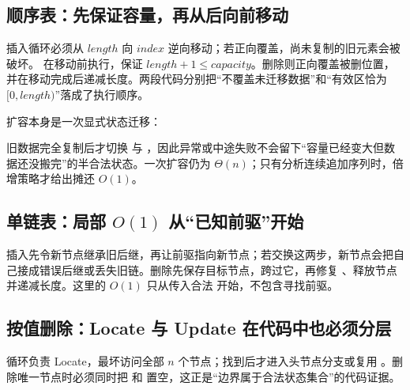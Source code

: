\documentclass[UTF8,fontset=none,11pt,a4paper]{ctexart}
\begin{document}
\subsection{顺序表：先保证容量，再从后向前移动}


插入循环必须从 $length$ 向 $index$ 逆向移动；若正向覆盖，尚未复制的旧元素会被破坏。 在移动前执行，保证 $length+1\le capacity$。删除则正向覆盖被删位置，并在移动完成后递减长度。两段代码分别把“不覆盖未迁移数据”和“有效区恰为 $[0,length)$”落成了执行顺序。

扩容本身是一次显式状态迁移：


旧数据完全复制后才切换  与 ，因此异常或中途失败不会留下“容量已经变大但数据还没搬完”的半合法状态。一次扩容仍为 $\Theta(n)$；只有分析连续追加序列时，倍增策略才给出摊还 $O(1)$。

\subsection{单链表：局部 \texorpdfstring{$O(1)$}{O(1)} 从“已知前驱”开始}


插入先令新节点继承旧后继，再让前驱指向新节点；若交换这两步，新节点会把自己接成错误后继或丢失旧链。删除先保存目标节点，跨过它，再修复 、释放节点并递减长度。这里的 $O(1)$ 只从传入合法  开始，不包含寻找前驱。

\subsection{按值删除：Locate 与 Update 在代码中也必须分层}


循环负责 Locate，最坏访问全部 $n$ 个节点；找到后才进入头节点分支或复用 。删除唯一节点时必须同时把  和  置空，这正是“边界属于合法状态集合”的代码证据。
\end{document}
